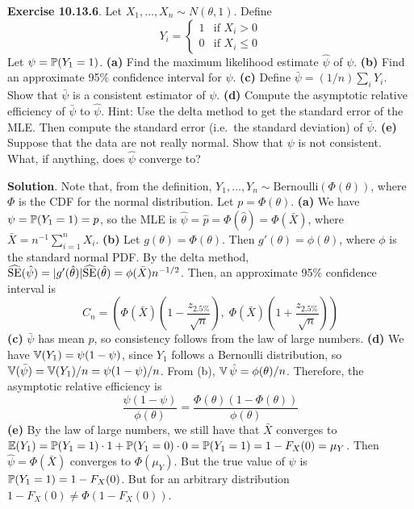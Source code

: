 \textbf{Exercise 10.13.6}. Let \(X_{1}, \dots, X_{n} \sim N(\theta, 1)\).
Define
\[
Y_{i} = \begin{cases}
1 & \text{if } X_{i} > 0 \\
0 & \text{if } X_{i} \leq 0
\end{cases}
\]
Let \(\psi = \operatorname{\mathbb{P}}(Y_{1} = 1)\).
\textbf{(a)} Find the maximum likelihood estimate \(\hat{\psi}\) of
\(\psi\).
\textbf{(b)} Find an approximate 95\% confidence interval for \(\psi\).
\textbf{(c)} Define \(\bar{\psi} = (1 / n) \sum_{i} Y_{i}\). Show that
\(\bar{\psi}\) is a consistent estimator of \(\psi\).
\textbf{(d)} Compute the asymptotic relative efficiency of
\(\bar{\psi}\) to \(\hat{\psi}\). Hint: Use the delta method to get
the standard error of the MLE. Then compute the standard error (i.e.~the
standard deviation) of \(\bar{\psi}\).
\textbf{(e)} Suppose that the data are not really normal. Show that
\(\psi\) is not consistent. What, if anything, does \(\hat{\psi}\)
converge to?

\textbf{Solution}.
Note that, from the definition,
\(Y_{1}, \dots, Y_{n} \sim \text{Bernoulli}(\Phi(\theta))\), where \(\Phi\)
is the CDF for the normal distribution. Let \(p = \Phi(\theta)\).
\textbf{(a)} We have \(\psi = \operatorname{\mathbb{P}}(Y_{1} = 1) = p\), so the MLE is
\(\hat{\psi} = \hat{p} = \Phi(\hat{\theta})
= \Phi(\bar{X})\), where
\(\bar{X} = n^{-1} \sum_{i=1}^{n} X_{i}\).
\textbf{(b)} Let \(g(\theta) = \Phi(\theta)\). Then
\(g'(\theta) = \phi(\theta)\), where \(\phi\) is the standard normal
PDF. By the delta method,
\(\widehat{\operatorname{\mathrm{SE}}}(\hat{\psi}) = |g'(\hat{\theta})| \widehat{\operatorname{\mathrm{SE}}}(\hat{\theta}) = \phi(\bar{X}) n^{-1/2}\).
Then, an approximate 95\% confidence interval is
\[
C_{n} = \left(\Phi(\bar{X}) \left(1 - \frac{z_{2.5\%}}{\sqrt{n}}\right), \; 
\Phi(\bar{X}) \left(1 + \frac{z_{2.5\%}}{\sqrt{n}}\right) \right)
\]
\textbf{(c)} \(\bar{\psi}\) has mean \(p\), so consistency follows
from the law of large numbers.
\textbf{(d)} We have \(\operatorname{\mathbb{V}}(Y_{1}) = \psi (1 - \psi)\), since
\(Y_{1}\) follows a Bernoulli distribution, so
\(\operatorname{\mathbb{V}}(\bar{\psi}) = \operatorname{\mathbb{V}}(Y_{1}) / n = \psi (1 - \psi) / n\).
From (b), \(\operatorname{\mathbb{V}}{\hat{\psi}} = \phi(\theta) / n\).
Therefore, the asymptotic relative efficiency is
\[
\frac{\psi(1 - \psi)}{\phi(\theta)} = \frac{\Phi(\theta)(1 - \Phi(\theta))}{\phi(\theta)}
\]
\textbf{(e)} By the law of large numbers, we still have that
\(\bar{X}\) converges to
\(\operatorname{\mathbb{E}}(Y_{1}) = \operatorname{\mathbb{P}}(Y_{1} = 1) \cdot 1 + \operatorname{\mathbb{P}}(Y_{1} = 0)\cdot 0 = \operatorname{\mathbb{P}}(Y_{1} = 1) = 1 - F_X(0) = \mu_Y\).
Then \(\hat{\psi} = \Phi(\bar{X})\) converges to \(\Phi(\mu_Y)\).
But the true value of \(\psi\) is \(\operatorname{\mathbb{P}}(Y_{1} = 1) = 1 - F_X(0)\).
But for an arbitrary distribution \(1 - F_X(0) \neq \Phi(1 - F_X(0))\).

